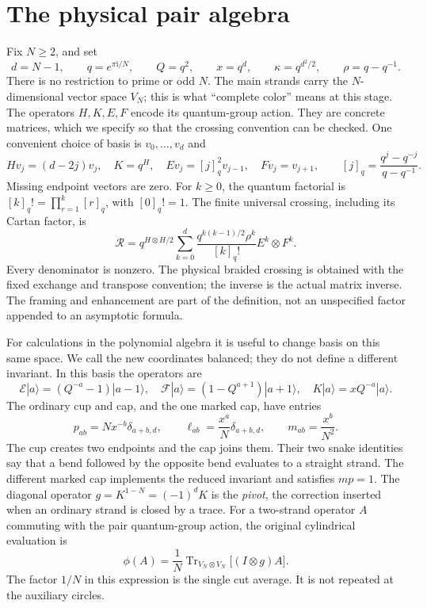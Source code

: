 \documentclass[11pt]{article}
\numberwithin{equation}{section}
\theoremstyle{definition}\newtheorem{definition}[theorem]{Definition}
\theoremstyle{remark}\newtheorem{remark}[theorem]{Remark}
\newcommand{\ii}{\mathrm i}\newcommand{\dd}{\mathrm d}
\newcommand{\Tr}{\operatorname{Tr}}\newcommand{\arccot}{\operatorname{arccot}}
\begin{document}
\section{The physical pair algebra}\label{nt:algebra}
Fix $N\ge2$, and set
\begin{equation}\label{eq:root-notation}
 d=N-1,\qquad q=e^{\pi\ii/N},\qquad Q=q^2,\qquad
 x=q^d,\qquad \kappa=q^{d^2/2},\qquad \rho=q-q^{-1}.
\end{equation}
There is no restriction to prime or odd $N$. The main strands carry the $N$-dimensional vector space $V_N$; this is what ``complete color'' means at this stage. The operators $H,K,E,F$ encode its quantum-group action. They are concrete matrices, which we specify so that the crossing convention can be checked. One convenient choice of basis is $v_0,\ldots,v_d$ and
\[
 H v_j=(d-2j)v_j,\quad K=q^H,\quad
 E v_j=[j]_q^2v_{j-1},\quad Fv_j=v_{j+1},
 \qquad [j]_q=\frac{q^j-q^{-j}}{q-q^{-1}}.
\]
Missing endpoint vectors are zero. For $k\ge0$, the quantum factorial is
$[k]_q!=\prod_{r=1}^k[r]_q$, with $[0]_q!=1$.
The finite universal crossing, including its Cartan factor, is
\begin{equation}\label{eq:universal-crossing}
 \mathscr R=q^{H\otimes H/2}
 \sum_{k=0}^{d}\frac{q^{k(k-1)/2}\rho^k}{[k]_q!}
 E^k\otimes F^k.
\end{equation}
Every denominator is nonzero. The physical braided crossing is obtained with the fixed exchange and transpose convention; the inverse is the actual matrix inverse. The framing and enhancement are part of the definition, not an unspecified factor appended to an asymptotic formula.

For calculations in the polynomial algebra it is useful to change basis on this same space. We call the new coordinates balanced; they do not define a different invariant. In this basis the operators are
\begin{equation}\label{eq:balanced-module}
 \mathcal E|a\rangle=(Q^{-a}-1)|a-1\rangle,\quad
 \mathcal F|a\rangle=(1-Q^{a+1})|a+1\rangle,\quad
 K|a\rangle=xQ^{-a}|a\rangle.
\end{equation}
The ordinary cup and cap, and the one marked cap, have entries
\begin{equation}\label{eq:cups}
 p_{ab}=Nx^{-b}\delta_{a+b,d},\qquad
 \ell_{ab}=\frac{x^a}{N}\delta_{a+b,d},\qquad
 m_{ab}=\frac{x^b}{N^2}.
\end{equation}
The cup creates two endpoints and the cap joins them. Their two snake identities say that a bend followed by the opposite bend evaluates to a straight strand. The different marked cap implements the reduced invariant and satisfies $mp=1$. The diagonal operator $g=K^{1-N}=(-1)^dK$ is the \emph{pivot}, the correction inserted when an ordinary strand is closed by a trace. For a two-strand operator $A$ commuting with the pair quantum-group action, the original cylindrical evaluation is
\begin{equation}\label{eq:phi-physical}
 \phi(A)=\frac1N\Tr_{V_N\otimes V_N}\bigl[(I\otimes g)A\bigr].
\end{equation}
The factor $1/N$ in this expression is the single cut average. It is not repeated at the auxiliary circles.
\end{document}
